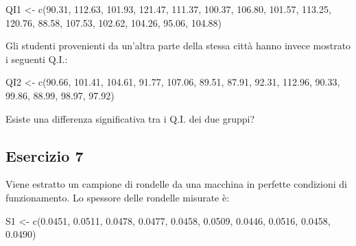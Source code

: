 \documentclass[a4paper,12pt,oneside]{book}
\newenvironment{Shaded}{\begin{snugshade}}{\end{snugshade}}
\newcommand{\FloatTok}[1]{#1}
\newcommand{\OtherTok}[1]{#1}
\newcommand{\FunctionTok}[1]{#1}
\newcommand{\NormalTok}[1]{#1}
\begin{document}
\begin{Shaded}
\begin{Highlighting}[]
\NormalTok{QI1 }\OtherTok{\textless{}{-}} \FunctionTok{c}\NormalTok{(}\FloatTok{90.31}\NormalTok{, }\FloatTok{112.63}\NormalTok{, }\FloatTok{101.93}\NormalTok{, }\FloatTok{121.47}\NormalTok{, }\FloatTok{111.37}\NormalTok{, }\FloatTok{100.37}\NormalTok{, }\FloatTok{106.80}\NormalTok{,}
         \FloatTok{101.57}\NormalTok{, }\FloatTok{113.25}\NormalTok{, }\FloatTok{120.76}\NormalTok{,  }\FloatTok{88.58}\NormalTok{, }\FloatTok{107.53}\NormalTok{, }\FloatTok{102.62}\NormalTok{, }\FloatTok{104.26}\NormalTok{,}
         \FloatTok{95.06}\NormalTok{, }\FloatTok{104.88}\NormalTok{)}
\end{Highlighting}
\end{Shaded}

Gli studenti provenienti da un'altra parte della stessa città hanno invece mostrato i seguenti Q.I.:

\begin{Shaded}
\begin{Highlighting}[]
\NormalTok{QI2 }\OtherTok{\textless{}{-}} \FunctionTok{c}\NormalTok{(}\FloatTok{90.66}\NormalTok{, }\FloatTok{101.41}\NormalTok{, }\FloatTok{104.61}\NormalTok{,  }\FloatTok{91.77}\NormalTok{, }\FloatTok{107.06}\NormalTok{,  }\FloatTok{89.51}\NormalTok{,  }\FloatTok{87.91}\NormalTok{,}
         \FloatTok{92.31}\NormalTok{, }\FloatTok{112.96}\NormalTok{,  }\FloatTok{90.33}\NormalTok{,  }\FloatTok{99.86}\NormalTok{,  }\FloatTok{88.99}\NormalTok{,  }\FloatTok{98.97}\NormalTok{,  }\FloatTok{97.92}\NormalTok{)}
\end{Highlighting}
\end{Shaded}

Esiste una differenza significativa tra i Q.I. dei due gruppi?

\hypertarget{esercizio-7-1}{%
\subsection{Esercizio 7}\label{esercizio-7-1}}

Viene estratto un campione di rondelle da una macchina in perfette condizioni di funzionamento. Lo spessore delle rondelle misurate è:

\begin{Shaded}
\begin{Highlighting}[]
\NormalTok{S1 }\OtherTok{\textless{}{-}} \FunctionTok{c}\NormalTok{(}\FloatTok{0.0451}\NormalTok{, }\FloatTok{0.0511}\NormalTok{, }\FloatTok{0.0478}\NormalTok{, }\FloatTok{0.0477}\NormalTok{, }\FloatTok{0.0458}\NormalTok{, }\FloatTok{0.0509}\NormalTok{, }\FloatTok{0.0446}\NormalTok{,}
        \FloatTok{0.0516}\NormalTok{, }\FloatTok{0.0458}\NormalTok{, }\FloatTok{0.0490}\NormalTok{)}
\end{Highlighting}
\end{Shaded}
\end{document}
